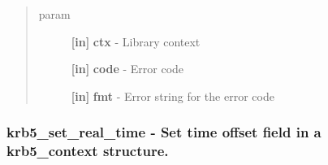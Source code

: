 \documentclass[letterpaper,10pt,english]{sphinxmanual}
\begin{document}
\begin{fulllineitems}
\label{appdev/refs/api/krb5_set_error_message:c.krb5_set_error_message}
\end{fulllineitems}

\begin{quote}\begin{description}
\item[{param}] \leavevmode
\textbf{{[}in{]}} \textbf{ctx} - Library context

\textbf{{[}in{]}} \textbf{code} - Error code

\textbf{{[}in{]}} \textbf{fmt} - Error string for the error code

\end{description}\end{quote}


\subsubsection{krb5\_set\_real\_time -  Set time offset field in a krb5\_context structure.}
\label{appdev/refs/api/krb5_set_real_time::doc}\label{appdev/refs/api/krb5_set_real_time:krb5-set-real-time-set-time-offset-field-in-a-krb5-context-structure}

\begin{fulllineitems}
\label{appdev/refs/api/krb5_set_real_time:c.krb5_set_real_time}
\end{fulllineitems}
\end{document}
